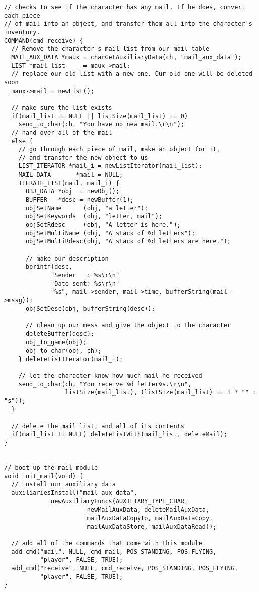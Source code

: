 \documentclass[12pt]{article}
\begin{document}
{\begin{verbatim}
// checks to see if the character has any mail. If he does, convert each piece
// of mail into an object, and transfer them all into the character's inventory.
COMMAND(cmd_receive) {
  // Remove the character's mail list from our mail table
  MAIL_AUX_DATA *maux = charGetAuxiliaryData(ch, "mail_aux_data");
  LIST *mail_list     = maux->mail;
  // replace our old list with a new one. Our old one will be deleted soon
  maux->mail = newList();

  // make sure the list exists
  if(mail_list == NULL || listSize(mail_list) == 0)
    send_to_char(ch, "You have no new mail.\r\n");
  // hand over all of the mail
  else {
    // go through each piece of mail, make an object for it, 
    // and transfer the new object to us
    LIST_ITERATOR *mail_i = newListIterator(mail_list);
    MAIL_DATA       *mail = NULL;
    ITERATE_LIST(mail, mail_i) {
      OBJ_DATA *obj  = newObj();
      BUFFER   *desc = newBuffer(1);
      objSetName      (obj, "a letter");
      objSetKeywords  (obj, "letter, mail");
      objSetRdesc     (obj, "A letter is here.");
      objSetMultiName (obj, "A stack of %d letters");
      objSetMultiRdesc(obj, "A stack of %d letters are here.");

      // make our description
      bprintf(desc, 
             "Sender   : %s\r\n"
             "Date sent: %s\r\n"
             "%s", mail->sender, mail->time, bufferString(mail->mssg));
      objSetDesc(obj, bufferString(desc));
      
      // clean up our mess and give the object to the character
      deleteBuffer(desc);
      obj_to_game(obj);
      obj_to_char(obj, ch);
    } deleteListIterator(mail_i);

    // let the character know how much mail he received
    send_to_char(ch, "You receive %d letter%s.\r\n", 
                 listSize(mail_list), (listSize(mail_list) == 1 ? "" : "s"));
  }

  // delete the mail list, and all of its contents
  if(mail_list != NULL) deleteListWith(mail_list, deleteMail);
}


// boot up the mail module
void init_mail(void) {
  // install our auxiliary data
  auxiliariesInstall("mail_aux_data",
		     newAuxiliaryFuncs(AUXILIARY_TYPE_CHAR,
				       newMailAuxData, deleteMailAuxData,
				       mailAuxDataCopyTo, mailAuxDataCopy,
				       mailAuxDataStore, mailAuxDataRead));

  // add all of the commands that come with this module
  add_cmd("mail", NULL, cmd_mail, POS_STANDING, POS_FLYING,
          "player", FALSE, TRUE);
  add_cmd("receive", NULL, cmd_receive, POS_STANDING, POS_FLYING,
          "player", FALSE, TRUE);
}
\end{verbatim}}
\end{document}
